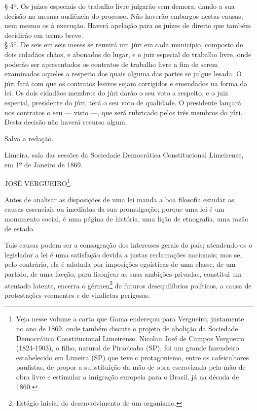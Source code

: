 § 4º. Os juízes especiais do trabalho livre julgarão sem demora, dando a
sua decisão na mesma audiência do processo. Não haverão embargos nestas
causas, nem mesmo os à execução. Haverá apelação para os juízes de
direito que também decidirão em termo breve.\\
§ 5º. De seis em seis meses se reunirá um júri em cada município,
composto de dois cidadãos chãos, e abonados do lugar, e o juiz especial
do trabalho livre, onde poderão ser apresentados os contratos de
trabalho livre a fim de serem examinados aqueles a respeito dos quais
alguma das partes se julgue lesada. O júri fará com que os contratos
lesivos sejam corrigidos e emendados na forma da lei. Os dois cidadãos
membros do júri darão o seu voto a respeito, e o juiz especial,
presidente do júri, terá o seu voto de qualidade. O presidente lançará
nos contratos o seu --- visto ---, que será rubricado pelos três
membros do júri. Desta decisão não haverá recurso algum.

Salva a redação.

Limeira, sala das sessões da Sociedade Democrática Constitucional
Limeirense, em 1º de Janeiro de 1869.

JOSÉ VERGUEIRO\footnote{Veja nesse volume a carta que Gama endereçou
  para Vergueiro, justamente no ano de 1869, onde também discute o
  projeto de abolição da Sociedade Democrática Constitucional
  Limeirense. Nicolau José de Campos Vergueiro (1824-1903), o filho,
  natural de Piracicaba (SP), foi um grande fazendeiro estabelecido em
  Limeira (SP) que teve o protagonismo, entre os cafeicultores
  paulistas, de propor a substituição da mão de obra escravizada pela
  mão de obra livre e estimular a imigração europeia para o Brasil, já
  na década de 1860.}.

Antes de analisar as disposições de uma lei manda a boa filosofia
estudar as causas essenciais ou imediatas da sua promulgação; porque uma
lei é um monumento social, é uma página de história, uma lição de
etnografia, uma razão de estado.

Tais causas podem ser a consagração dos interesses gerais do país;
atendendo-os o legislador a lei é uma satisfação devida a justas
reclamações nacionais; mas se, pelo contrário, ela é adotada por
imposições egoísticas de uma classe, de um partido, de uma facção, para
lisonjear as suas ambições privadas, constitui um atentado latente,
encerra o gérmen\footnote{Estágio inicial do desenvolvimento de um
  organismo.} de futuros desequilíbrios políticos, a causa de
protestações veementes e de vindictas perigosas.

